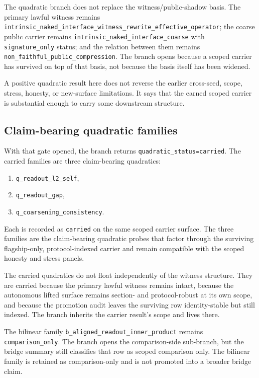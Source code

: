 \documentclass[11pt]{article}
\theoremstyle{definition}
\begin{document}
The quadratic branch does not replace the witness/public-shadow basis. The primary
lawful witness remains
\nolinkurl{intrinsic_naked_interface_witness_rewrite_effective_operator}; the coarse
public carrier remains \nolinkurl{intrinsic_naked_interface_coarse} with
\texttt{signature\_only} status; and the relation between them remains
\texttt{non\_faithful\_public\_compression}. The branch opens because a scoped carrier
has survived on top of that basis, not because the basis itself has been widened.

A positive quadratic result here does not reverse the earlier cross-seed, scope,
stress, honesty, or new-surface limitations. It says that the earned scoped carrier is
substantial enough to carry some downstream structure.

\subsection{Claim-bearing quadratic families}

With that gate opened, the branch returns \texttt{quadratic\_status=carried}. The carried
families are three claim-bearing quadratics:
\begin{enumerate}[label=\arabic*.,leftmargin=2.0em,itemsep=0.2em]
\item \texttt{q\_readout\_l2\_self},
\item \texttt{q\_readout\_gap},
\item \texttt{q\_coarsening\_consistency}.
\end{enumerate}
Each is recorded as \texttt{carried} on the same scoped carrier surface. The three
families are the claim-bearing quadratic probes that factor through the surviving
flagship-only, protocol-indexed carrier and remain compatible with the scoped honesty
and stress panels.

The carried quadratics do not float independently of the witness structure. They are
carried because the primary lawful witness remains intact, because the autonomous
lifted surface remains section- and protocol-robust at its own scope, and because the
promotion audit leaves the surviving row identity-stable but still indexed. The branch
inherits the carrier result's scope and lives there.

The bilinear family \nolinkurl{b_aligned_readout_inner_product} remains
\texttt{comparison\_only}. The branch opens the comparison-side sub-branch, but the
bridge summary still classifies that row as scoped comparison only. The bilinear family
is retained as comparison-only and is not promoted into a broader bridge claim.
\end{document}
